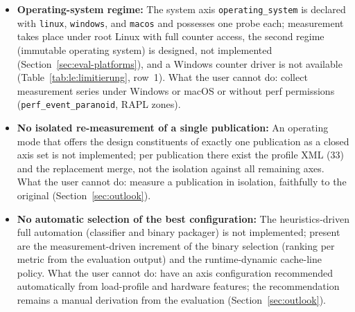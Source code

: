 \begin{nurlang}
\begin{itemize}
  user cannot do: operate a hybrid tier that switches between preloaded binaries at run time; the
  state handover on switching --- the memento reconciliation with the two release artefacts single
  and hybrid in the store --- is likewise designed, not implemented.
  \item \textbf{Operating-system regime:} The system axis \texttt{operating\_system} is declared
  with \texttt{linux}, \texttt{windows}, and \texttt{macos} and possesses one probe each;
  measurement takes place under root Linux with full counter access, the second regime (immutable
  operating system) is designed, not implemented (Section~\ref{sec:eval-platforms}), and a Windows
  counter driver is not available (Table~\ref{tab:le:limitierung}, row~1). What the user cannot
  do: collect measurement series under Windows or macOS or without perf permissions
  (\texttt{perf\_event\_paranoid}, RAPL zones).
  \item \textbf{No isolated re-measurement of a single publication:} An operating mode that offers
  the design constituents of exactly one publication as a closed axis set is not implemented; per
  publication there exist the profile XML (33) and the replacement merge, not the isolation against
  all remaining axes. What the user cannot do: measure a publication in isolation, faithfully to
  the original (Section~\ref{sec:outlook}).
  \item \textbf{No automatic selection of the best configuration:} The heuristics-driven full
  automation (classifier and binary packager) is not implemented; present are the
  measurement-driven increment of the binary selection (ranking per metric from the evaluation
  output) and the runtime-dynamic cache-line policy. What the user cannot do: have an axis
  configuration recommended automatically from load-profile and hardware features; the
  recommendation remains a manual derivation from the evaluation (Section~\ref{sec:outlook}).
\end{itemize}
\end{nurlang}
